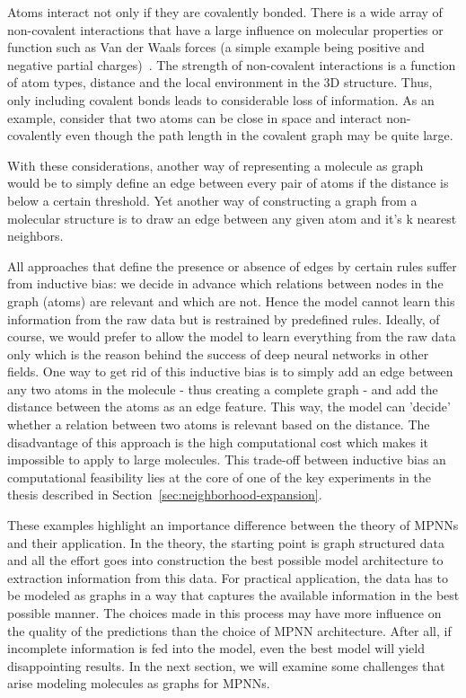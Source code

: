 Atoms interact not only if they are covalently bonded. There is a wide array of non-covalent interactions that have a large influence on molecular properties or function such as Van der Waals forces (a simple example being positive and negative partial charges)~\cite{Organic-chemistry}. The strength of non-covalent interactions is a function of atom types, distance and the local environment in the 3D structure. Thus, only including covalent bonds leads to considerable loss of information. As an example, consider that two atoms can be close in space and interact non-covalently even though the path length in the covalent graph may be quite large.

With these considerations, another way of representing a molecule as graph would be to simply define an edge between every pair of atoms if the distance is below a certain threshold. Yet another way of constructing a graph from a molecular structure is to draw an edge between any given atom and it's k nearest neighbors.

All approaches that define the presence or absence of edges by certain rules suffer from inductive bias: we decide in advance which relations between nodes in the graph (atoms) are relevant and which are not. Hence the model cannot learn this information from the raw data but is restrained by predefined rules. Ideally, of course, we would prefer to allow the model to learn everything from the raw data only which is the reason behind the success of deep neural networks in other fields. One way to get rid of this inductive bias is to simply add an edge between any two atoms in the molecule - thus creating a complete graph - and add the distance between the atoms as an edge feature. This way, the model can 'decide' whether a relation between two atoms is relevant based on the distance. The disadvantage of this approach is the high computational cost which makes it impossible to apply to large molecules. This trade-off between inductive bias an computational feasibility lies at the core of one of the key experiments in the thesis described in Section~\ref{sec:neighborhood-expansion}.

%

These examples highlight an importance difference between the theory of MPNNs and their application. In the theory, the starting point is graph structured data and all the effort goes into construction the best possible model architecture to extraction information from this data. For practical application, the data has to be modeled as graphs in a way that captures the available information in the best possible manner. The choices made in this process may have more influence on the quality of the predictions than the choice of MPNN architecture. After all, if incomplete information is fed into the model, even the best model will yield disappointing results. In the next section, we will examine some challenges that arise modeling molecules as graphs for MPNNs.


